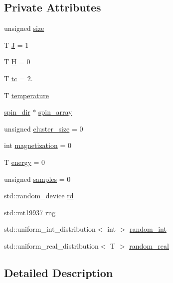 \subsection*{Private Attributes}
\begin{DoxyCompactItemize}
\item 
unsigned \mbox{\hyperlink{classIsingModel_aec6fc4774dda94fd23c6e29d0820b63a}{size}}
\item 
T \mbox{\hyperlink{classIsingModel_af0c6d48208741fe5a378e29b7fac0da1}{J}} = 1
\item 
T \mbox{\hyperlink{classIsingModel_a19e1a223476c953a9964532c7f0eb6dd}{H}} = 0
\item 
T \mbox{\hyperlink{classIsingModel_af19ba376c01404c094c214939eafd7a5}{tc}} = 2.
\item 
T \mbox{\hyperlink{classIsingModel_a756faa94432cc7e10d21e52a03156569}{temperature}}
\item 
\mbox{\hyperlink{classspin__dir}{spin\+\_\+dir}} $\ast$ \mbox{\hyperlink{classIsingModel_a82425f60fa2dd07995c2a53f8a850cf5}{spin\+\_\+array}}
\item 
unsigned \mbox{\hyperlink{classIsingModel_a67a282de0cc889e423cde222a3453d38}{cluster\+\_\+size}} = 0
\item 
int \mbox{\hyperlink{classIsingModel_a20c8183929e5e2a395cb962501122e65}{magnetization}} = 0
\item 
T \mbox{\hyperlink{classIsingModel_abd38e1a93e1e7bab7788f00d0b9fddb9}{energy}} = 0
\item 
unsigned \mbox{\hyperlink{classIsingModel_a434e854082ad794811b6e11e2bc50eaf}{samples}} = 0
\item 
std\+::random\+\_\+device \mbox{\hyperlink{classIsingModel_a602475ebc23d97e2ba162ba1db352386}{rd}}
\item 
std\+::mt19937 \mbox{\hyperlink{classIsingModel_a3250275d0897da9f7929b43286e9b44b}{rng}}
\item 
std\+::uniform\+\_\+int\+\_\+distribution$<$ int $>$ \mbox{\hyperlink{classIsingModel_a5f412d0560c599a350d0c266125427c9}{random\+\_\+int}}
\item 
std\+::uniform\+\_\+real\+\_\+distribution$<$ T $>$ \mbox{\hyperlink{classIsingModel_a01dcb867d89771158b7f71a518ded0f2}{random\+\_\+real}}
\end{DoxyCompactItemize}


\subsection{Detailed Description}

